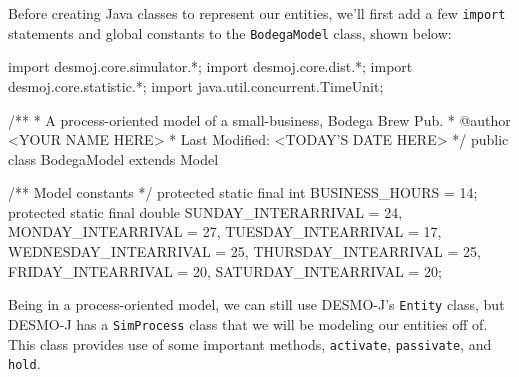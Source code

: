 \documentclass[11pt]{article}
\newcommand{\code}[1]{\texttt{#1}}
\newcommand{\class}[1]{\texttt{#1}}
\newcommand{\method}[1]{\texttt{#1}}
\begin{document}
Before creating Java classes to represent our entities, we'll first add a few
\code{import} statements and global constants to the
\class{BodegaModel} class, shown below:
\begin{java}
import desmoj.core.simulator.*;
import desmoj.core.dist.*;
import desmoj.core.statistic.*;
import java.util.concurrent.TimeUnit;

/**
 * A process-oriented model of a small-business, Bodega Brew Pub.
 * @author <YOUR NAME HERE>
 * Last Modified: <TODAY'S DATE HERE>
 */
public class BodegaModel extends Model
{

    /** Model constants */
    protected static final int BUSINESS_HOURS = 14;
    protected static final double
    		SUNDAY_INTERARRIVAL = 24,
		MONDAY_INTEARRIVAL = 27,
		TUESDAY_INTEARRIVAL = 17,
		WEDNESDAY_INTEARRIVAL = 25,
		THURSDAY_INTEARRIVAL = 25,
		FRIDAY_INTEARRIVAL = 20,
		SATURDAY_INTEARRIVAL = 20;
}
\end{java}

Being in a process-oriented model, we can still use DESMO-J's \class{Entity} class, but DESMO-J has a \class{SimProcess} class that we will be modeling our entities off of.
This class provides use of some important methods, \method{activate}, \method{passivate}, and \method{hold}.
\end{document}
